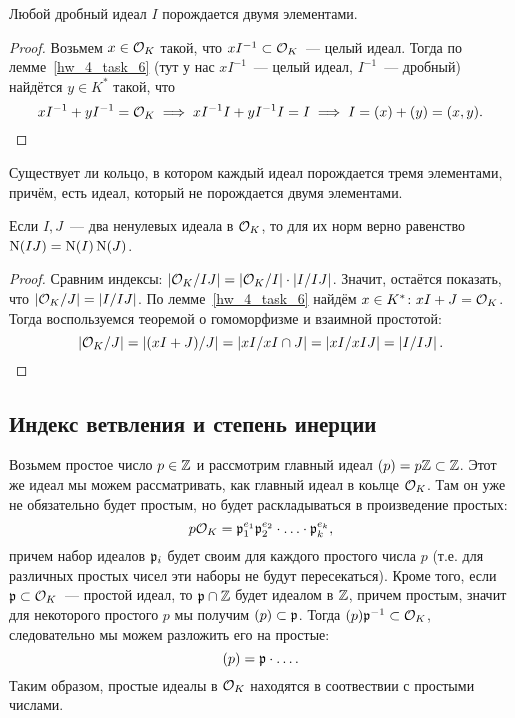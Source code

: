 	\begin{theorem} 
		Любой дробный идеал $I$ порождается двумя элементами. 
	\end{theorem}
	\begin{proof}
		Возьмем $x \in \mathcal{O}_{K}$ такой, что $x I^{-1} \subset \mathcal{O}_{K}$~--- целый идеал. Тогда по лемме~\ref{hw_4_task_6} (тут у нас $x I^{-1}$~--- целый идеал, $I^{-1}$~--- дробный) найдётся $y \in K^{*}$ такой, что 
		\[
			xI^{-1} + yI^{-1} = \mathcal{O}_{K} \implies x I^{-1}I + y I^{-1}I = I \implies I = (x) + (y) = (x, y).
		\]
	\end{proof}

	\begin{homework}
		Существует ли кольцо, в котором каждый идеал порождается тремя элементами, причём, есть идеал, который не порождается двумя элементами. 
	\end{homework}

	\begin{theorem}
		Если $I, J$~--- два ненулевых идеала в $\mathcal{O}_{K}$, то для их норм верно равенство $\operatorname{\mathrm{N}}(I J) = \operatorname{\mathrm{N}}(I) \operatorname{\mathrm{N}}(J)$.
	\end{theorem}
	\begin{proof}
		Сравним индексы: $\left\lvert \mathcal{O}_{K}/IJ \right\rvert = \left\lvert \mathcal{O}_{K}/I \right\rvert \cdot \left\lvert I/IJ \right\rvert$. Значит, остаётся показать, что $\left\lvert \mathcal{O}_{K}/J \right\rvert = \left\lvert I/IJ \right\rvert$. По лемме~\ref{hw_4_task_6} найдём $x \in K^{*}\colon xI + J = \mathcal{O}_{K}$. Тогда воспользуемся теоремой о гомоморфизме и взаимной простотой:
		\[
			\left\lvert  \cO_{K} / J \right\rvert = \left\lvert \lr*{xI + J} / J \right\rvert = \left\lvert xI / xI \cap J \right\rvert = \left\lvert xI / x I J \right\rvert = \left\lvert I / IJ \right\rvert.
		\]
	\end{proof}

	\subsection{Индекс ветвления и степень инерции}

	Возьмем простое число $p \in \mathbb{Z}$ и рассмотрим главный идеал $(p) = p\mathbb{Z} \subset \mathbb{Z}$. Этот же идеал мы можем рассматривать, как главный идеал в коьлце $\mathcal{O}_{K}$. Там он уже не обязательно будет простым, но будет раскладываться в произведение простых: 
	\[
		p\mathcal{O}_{K} = \mathfrak{p}_{1}^{e_1} \mathfrak{p}_{2}^{e_2} \cdot \ldots \cdot \mathfrak{p}_{k}^{e_k},
	\]
	причем набор идеалов $\mathfrak{p}_{i}$ будет своим для каждого простого числа $p$ (т.е. для различных простых чисел эти наборы не будут пересекаться). Кроме того, если $\mathfrak{p} \subset \mathcal{O}_{K}$~--- простой идеал, то $\mathfrak{p} \cap \mathbb{Z}$ будет идеалом в $\mathbb{Z}$, причем простым, значит для некоторого простого $p$ мы получим $(p) \subset \mathfrak{p}$. Тогда $(p) \mathfrak{p}^{-1} \subset \mathcal{O}_{K}$, следовательно мы можем разложить его на простые: 
	\[
		(p) = \mathfrak{p} \cdot \ldots.
	\]
	Таким образом, простые идеалы в $\mathcal{O}_{K}$ находятся в соотвествии с простыми числами. 

